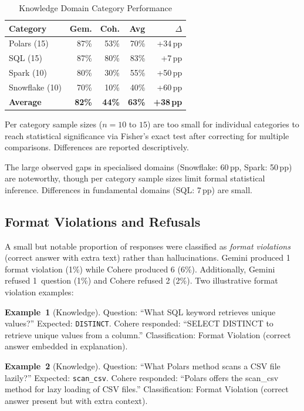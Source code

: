 \documentclass[12pt,a4paper]{article}
\begin{document}
\begin{table}[ht]
\centering
\caption{Knowledge Domain Category Performance}
\label{tab:knowledge}
\begin{tabular}{l r r r r}
\toprule
\textbf{Category} & \textbf{Gem.} & \textbf{Coh.} & \textbf{Avg} & \textbf{$\Delta$} \\
\midrule
Polars (15)     & 87\% & 53\% & 70\% & +34\,pp \\
SQL (15)        & 87\% & 80\% & 83\% & +7\,pp  \\
Spark (10)      & 80\% & 30\% & 55\% & +50\,pp \\
Snowflake (10)  & 70\% & 10\% & 40\% & +60\,pp \\
\midrule
\textbf{Average} & \textbf{82\%} & \textbf{44\%} & \textbf{63\%} & \textbf{+38\,pp} \\
\bottomrule
\end{tabular}

\smallskip
\footnotesize Per category sample sizes ($n=10$ to $15$) are too small for individual categories to reach statistical significance via Fisher's exact test after correcting for multiple comparisons. Differences are reported descriptively.
\end{table}

The large observed gaps in specialised domains (Snowflake: 60\,pp, Spark: 50\,pp) are noteworthy, though per category sample sizes limit formal statistical inference. Differences in fundamental domains (SQL: 7\,pp) are small.

\subsection{Format Violations and Refusals}

A small but notable proportion of responses were classified as \emph{format violations} (correct answer with extra text) rather than hallucinations. Gemini produced 1 format violation (1\%) while Cohere produced 6 (6\%). Additionally, Gemini refused 1~question (1\%) and Cohere refused 2 (2\%). Two illustrative format violation examples:

\textbf{Example~1} (Knowledge). Question: ``What SQL keyword retrieves unique values?'' Expected: \texttt{DISTINCT}. Cohere responded: ``SELECT DISTINCT to retrieve unique values from a column.'' Classification: Format Violation (correct answer embedded in explanation).

\textbf{Example~2} (Knowledge). Question: ``What Polars method scans a CSV file lazily?'' Expected: \texttt{scan\_csv}. Cohere responded: ``Polars offers the scan\_csv method for lazy loading of CSV files.'' Classification: Format Violation (correct answer present but with extra context).
\end{document}
